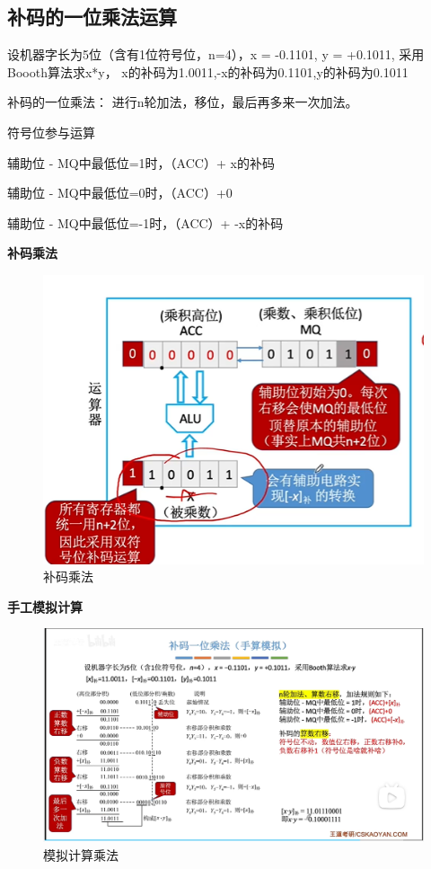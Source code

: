 \documentclass[12pt]{ctexart}
\begin{document}
\subsection{补码的一位乘法运算}
设机器字长为5位（含有1位符号位，n=4），x = -0.1101, y = +0.1011,
采用Boooth算法求x*y，
x的补码为1.0011,-x的补码为0.1101,y的补码为0.1011

补码的一位乘法：
进行n轮加法，移位，最后再多来一次加法。

符号位参与运算 

辅助位 - MQ中最低位=1时，（ACC）+ x的补码

辅助位 - MQ中最低位=0时，（ACC）+0

辅助位 - MQ中最低位=-1时，（ACC）+ -x的补码

\textbf{补码乘法}
\begin{figure}[htbp]
    \centering
    \includegraphics[scale=0.6]{补码乘法.png}
    \caption{补码乘法}
    \end{figure} 
\textbf{手工模拟计算}
    \begin{figure}[htbp]
        \centering
        \includegraphics[scale=0.6]{模拟计算.png}
        \caption{模拟计算乘法}
        \end{figure} 
\end{document}
